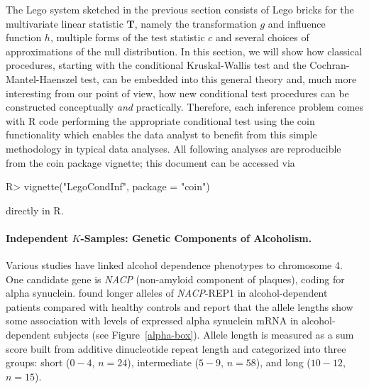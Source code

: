 \documentclass{article}
\newcommand{\Rpackage}[1]{{\normalfont\fontseries{b}\selectfont #1}}
\newcommand{\RR}{\textsf{R}}
\newcommand{\T}{\mathbf{T}}
\newenvironment{Schunk}{}{}
\begin{document}
The Lego system sketched in the previous section consists of Lego bricks for 
the multivariate linear statistic $\T$, namely the transformation $g$ and
influence function $h$, multiple forms of the test statistic $c$ and several choices
of approximations of the null distribution. In this section, we will show how
classical procedures, starting with the conditional Kruskal-Wallis test and
the Cochran-Mantel-Haenszel test, can be embedded into this general theory
and, much more interesting from our point of view, how new conditional test
procedures can be constructed conceptually \textit{and} practically. 
Therefore, each inference problem comes with \RR{} code performing the
appropriate conditional test using the \Rpackage{coin} functionality 
which enables the data analyst to benefit from this
simple methodology in typical data analyses. All following analyses are
reproducible from the \Rpackage{coin} package vignette; this document 
can be accessed via
\begin{Schunk}
\begin{Sinput}
R> vignette("LegoCondInf", package = "coin")
\end{Sinput}
\end{Schunk}
directly in \RR{}.

\paragraph{Independent $K$-Samples: Genetic Components of Alcoholism.}

Various studies have linked alcohol dependence phenotypes to chromosome 4.  
One candidate gene is \textit{NACP} (non-amyloid component of plaques), 
coding for alpha synuclein. 
\cite{Boenscheta2005} found longer alleles of
\textit{NACP}-REP1 in alcohol-dependent patients compared with healthy controls
and report that the allele lengths show some
association with levels of expressed alpha synuclein mRNA in
alcohol-dependent subjects (see Figure~\ref{alpha-box}). Allele length is
measured as a sum score built from additive dinucleotide repeat length and
categorized into three groups: short ($0-4$, $n = 24$), intermediate ($5-9$,
$n = 58$), and long ($10-12$, $n = 15$).
\end{document}
